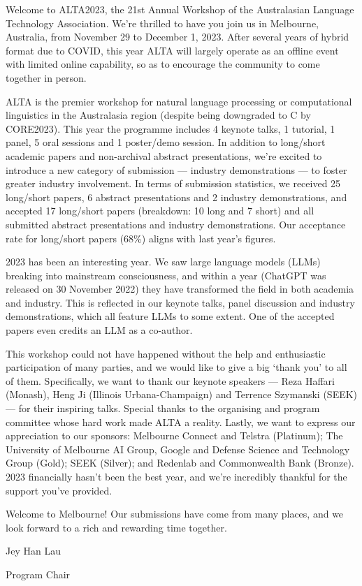 Welcome to ALTA2023, the 21st Annual Workshop of the Australasian Language Technology Association. We're thrilled to have you join us in Melbourne, Australia, from November 29 to December 1, 2023. After several years of hybrid format due to COVID, this year ALTA will largely operate as an offline event with limited online capability, so as to encourage the community to come together in person.\newline

ALTA is the premier workshop for natural language processing or computational linguistics in the Australasia region (despite being downgraded to C by CORE2023). This year the programme includes 4 keynote talks, 1 tutorial, 1 panel, 5 oral sessions and 1 poster/demo session. In addition to long/short academic papers and non-archival abstract presentations, we're excited to introduce a new category of submission --- industry demonstrations --- to foster greater industry involvement. In terms of submission statistics, we received 25 long/short papers, 6 abstract presentations and 2 industry demonstrations, and accepted 17 long/short papers (breakdown: 10 long and 7 short) and all submitted abstract presentations and industry demonstrations. Our acceptance rate for long/short papers (68\%) aligns with last year's figures.\newline

2023 has been an interesting year. We saw large language models (LLMs) breaking into mainstream consciousness, and within a year (ChatGPT was released on 30 November 2022) they have transformed the field in both academia and industry. This is reflected in our keynote talks, panel discussion and industry demonstrations, which all feature LLMs to some extent. One of the accepted papers even credits an LLM as a co-author.\newline

This workshop could not have happened without the help and enthusiastic participation of many parties, and we would like to give a big `thank you' to all of them. Specifically, we want to thank our keynote speakers --- Reza Haffari (Monash), Heng Ji (Illinois Urbana-Champaign) and Terrence Szymanski (SEEK) --- for their inspiring talks. Special thanks to the organising and program committee whose hard work made ALTA a reality. Lastly, we want to express our appreciation to our sponsors: Melbourne Connect and Telstra (Platinum); The University of Melbourne AI Group, Google and Defense Science and Technology Group (Gold); SEEK (Silver); and Redenlab and Commonwealth Bank (Bronze). 2023 financially hasn't been the best year, and we're incredibly thankful for the support you've provided.\newline

Welcome to Melbourne! Our submissions have come from many places, and we look forward to a rich and rewarding time together.\newline\newline\newline

Jey Han Lau\newline

Program Chair

